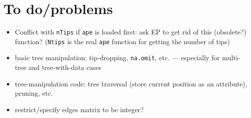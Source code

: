 \documentclass{article}
\newcommand{\code}[1]{{{\tt #1}}}
\begin{document}
\section{To do/problems}

\begin{itemize}
\item Conflict with \code{nTips} if \code{ape} is loaded first:
ask EP to get rid of this (obsolete?) function? (\code{Ntips}
is the real \code{ape} function for getting the number of tips)
\item basic tree manipulation: tip-dropping, \code{na.omit}, etc. --- 
  especially for multi-tree and tree-with-data cases
\item tree-manipulation code: tree traversal (store current
  position as an attribute), pruning, etc.
\item restrict/specify edges matrix to be integer?
\end{itemize}
\end{document}
